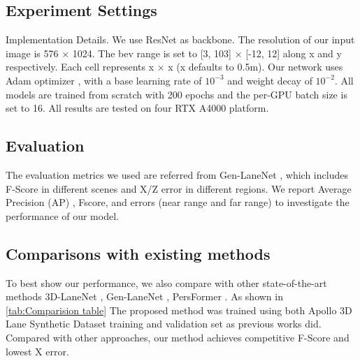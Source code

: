 \subsection{Experiment Settings}
\label{subsec:Experiment Settings}
Implementation Details. We use ResNet \cite{he2016deep} as backbone.
The resolution of our input image is 576 × 1024.
The bev range is set to [3, 103] × [-12, 12] along x and y respectively.
Each cell represents x × x (x defaults to 0.5m).
Our network uses Adam optimizer \cite{kingma2014adam}, with a base learning rate of $10^{-3}$ and weight decay of $10^{-2}$.
All models are trained from scratch with 200 epochs and the per-GPU batch size is set to 16.
All results are tested on four RTX A4000 platform.

\subsection{Evaluation}
\label{subsec:Evaluation}
The evaluation metrics we used are referred from Gen-LaneNet \cite{guo2020gen}, which includes F-Score in different scenes and X/Z error in different regions.
We report Average Precision (AP) , Fscore, and errors (near range and far range) to investigate the performance of our model.

\subsection{Comparisons with existing methods}
To best show our performance, we also compare with other state-of-the-art methods 3D-LaneNet \cite{garnett20193d}, Gen-LaneNet \cite{guo2020gen}, PersFormer \cite{chen2022persformer}.
As shown in \ref{tab:Comparision table}
The proposed method was trained using both Apollo 3D Lane Synthetic Dataset training and validation set as previous works did.
Compared with other approaches, our method achieves competitive F-Score and lowest X error.